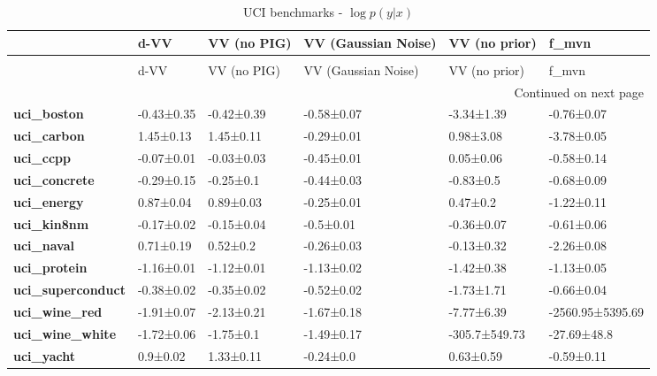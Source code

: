 \begin{longtable}[l]{llllll}
\caption{UCI benchmarks - $\log p(y|x)$}\\
\toprule
{} &        d-VV & VV (no PIG) & VV (Gaussian Noise) &  VV (no prior) &             f\_mvn \\
\midrule
\endfirsthead
\caption[]{UCI benchmarks - $\log p(y|x)$} \\
\toprule
{} &        d-VV & VV (no PIG) & VV (Gaussian Noise) &  VV (no prior) &             f\_mvn \\
\midrule
\endhead
\midrule
\multicolumn{6}{r}{{Continued on next page}} \\
\midrule
\endfoot

\bottomrule
\endlastfoot
\textbf{uci\_boston      } &  -0.43±0.35 &  -0.42±0.39 &          -0.58±0.07 &     -3.34±1.39 &        -0.76±0.07 \\
\textbf{uci\_carbon      } &   1.45±0.13 &   1.45±0.11 &          -0.29±0.01 &      0.98±3.08 &        -3.78±0.05 \\
\textbf{uci\_ccpp        } &  -0.07±0.01 &  -0.03±0.03 &          -0.45±0.01 &      0.05±0.06 &        -0.58±0.14 \\
\textbf{uci\_concrete    } &  -0.29±0.15 &   -0.25±0.1 &          -0.44±0.03 &      -0.83±0.5 &        -0.68±0.09 \\
\textbf{uci\_energy      } &   0.87±0.04 &   0.89±0.03 &          -0.25±0.01 &       0.47±0.2 &        -1.22±0.11 \\
\textbf{uci\_kin8nm      } &  -0.17±0.02 &  -0.15±0.04 &           -0.5±0.01 &     -0.36±0.07 &        -0.61±0.06 \\
\textbf{uci\_naval       } &   0.71±0.19 &    0.52±0.2 &          -0.26±0.03 &     -0.13±0.32 &        -2.26±0.08 \\
\textbf{uci\_protein     } &  -1.16±0.01 &  -1.12±0.01 &          -1.13±0.02 &     -1.42±0.38 &        -1.13±0.05 \\
\textbf{uci\_superconduct} &  -0.38±0.02 &  -0.35±0.02 &          -0.52±0.02 &     -1.73±1.71 &        -0.66±0.04 \\
\textbf{uci\_wine\_red    } &  -1.91±0.07 &  -2.13±0.21 &          -1.67±0.18 &     -7.77±6.39 &  -2560.95±5395.69 \\
\textbf{uci\_wine\_white  } &  -1.72±0.06 &   -1.75±0.1 &          -1.49±0.17 &  -305.7±549.73 &       -27.69±48.8 \\
\textbf{uci\_yacht       } &    0.9±0.02 &   1.33±0.11 &           -0.24±0.0 &      0.63±0.59 &        -0.59±0.11 \\
\end{longtable}
